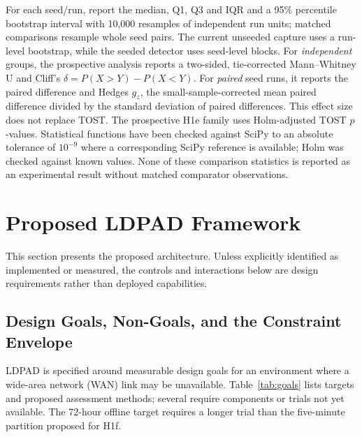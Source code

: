 \documentclass{ieeeaccess}
\begin{document}
For each seed/run, report the median, Q1, Q3 and IQR and a 95\% percentile bootstrap interval with 10,000 resamples of independent run units; matched comparisons resample whole seed pairs. The current unseeded capture uses a run-level bootstrap, while the seeded detector uses seed-level blocks. For \emph{independent} groups, the prospective analysis reports a two-sided, tie-corrected Mann--Whitney U and Cliff's $\delta=P(X>Y)-P(X<Y)$. For \emph{paired} seed runs, it reports the paired difference and Hedges $g_z$, the small-sample-corrected mean paired difference divided by the standard deviation of paired differences. This effect size does not replace TOST. The prospective H1e family uses Holm-adjusted TOST $p$-values. Statistical functions have been checked against SciPy to an absolute tolerance of $10^{-9}$ where a corresponding SciPy reference is available; Holm was checked against known values. None of these comparison statistics is reported as an experimental result without matched comparator observations.

\section{Proposed LDPAD Framework}
\label{sec:ldpad}

This section presents the proposed architecture. Unless explicitly identified as implemented or measured, the controls and interactions below are design requirements rather than deployed capabilities.

\subsection{Design Goals, Non-Goals, and the Constraint Envelope}
\label{subsec:goals}

LDPAD is specified around measurable design goals for an environment where a wide-area network (WAN) link may be unavailable. Table~\ref{tab:goals} lists targets and proposed assessment methods; several require components or trials not yet available. The 72-hour offline target requires a longer trial than the five-minute partition proposed for H1f.
\end{document}
